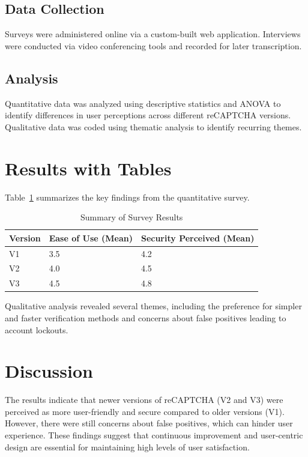 \documentclass{article}
\begin{document}
\subsection{Data Collection}
Surveys were administered online via a custom-built web application. Interviews were conducted via video conferencing tools and recorded for later transcription.

\subsection{Analysis}
Quantitative data was analyzed using descriptive statistics and ANOVA to identify differences in user perceptions across different reCAPTCHA versions. Qualitative data was coded using thematic analysis to identify recurring themes.

\section{Results with Tables}
Table~\ref{tab:results} summarizes the key findings from the quantitative survey.

\begin{table}[ht]
\centering
\caption{Summary of Survey Results}
\label{tab:results}
\begin{tabular}{@{}lll@{}}
\toprule
\textbf{Version} & \textbf{Ease of Use (Mean)} & \textbf{Security Perceived (Mean)} \\
\midrule
V1 & 3.5 & 4.2 \\
V2 & 4.0 & 4.5 \\
V3 & 4.5 & 4.8 \\
\bottomrule
\end{tabular}
\end{table}

Qualitative analysis revealed several themes, including the preference for simpler and faster verification methods and concerns about false positives leading to account lockouts.

\section{Discussion}
The results indicate that newer versions of reCAPTCHA (V2 and V3) were perceived as more user-friendly and secure compared to older versions (V1). However, there were still concerns about false positives, which can hinder user experience. These findings suggest that continuous improvement and user-centric design are essential for maintaining high levels of user satisfaction.
\end{document}
